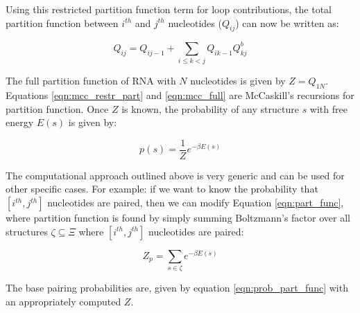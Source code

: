 Using this restricted partition function term for loop contributions, the total partition function between $i^{th}$ and $j^{th}$ nucleotides ($Q_{ij}$) can now be written as:

\begin{equation}
    Q_{ij} = Q_{i j-1} + \sum_{i \leq k <j} Q_{i k-1} Q_{kj}^b
    \label{eqn:mcc_full}
\end{equation}

The full partition function of RNA with $N$ nucleotides is given by $Z = Q_{1N}$. Equations \ref{eqn:mcc_restr_part} and \ref{eqn:mcc_full} are McCaskill's recursions for partition function. Once $Z$ is known, the probability of any structure $s$ with free energy $E(s)$ is given by:

\begin{equation}
\label{eqn:prob_part_func}
    p(s) = \frac{1}{Z} e^{-\beta E(s)}
\end{equation}

The computational approach outlined above is very generic and can be used for other specific cases. For example: if we want to know the probability that $[i^{th}, j^{th}]$ nucleotides are paired, then we can modify Equation \ref{eqn:part_func}, where partition function is found by simply summing Boltzmann's factor over all structures $\zeta \subseteq \Xi$ where $[i^{th}, j^{th}]$ nucleotides are paired:

\begin{equation}
    Z_p = \sum_{s\in\zeta} e^{-\beta E(s)}
\end{equation}

The base pairing probabilities are, given by equation \ref{eqn:prob_part_func} with an appropriately computed $Z$. %
